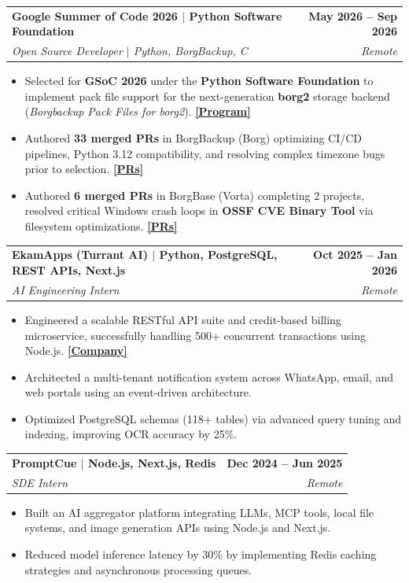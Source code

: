 \documentclass[letterpaper,11pt]{article}
\makeatletter
\newcommand{\resumeItem}[1]{
  \item\small{
    {#1 \vspace{-2pt}}
  }
}
\newcommand{\resumeSubheading}[4]{
  \vspace{-2pt}\item
    \begin{tabular*}{1.0\textwidth}[t]{l@{\extracolsep{\fill}}r}
      \textbf{#1} & \textbf{\small #2} \\
      \textit{\small#3} & \textit{\small #4} \\
    \end{tabular*}\vspace{-7pt}
}
\newcommand{\resumeItemListStart}{\begin{itemize}[itemsep=-2pt]}
\newcommand{\resumeItemListEnd}{\end{itemize}\vspace{-5pt}}
\makeatother
\begin{document}
    \resumeSubheading
      {\textbf{Google Summer of Code 2026} $|$ \textmd{Python Software Foundation}}{May 2026 -- Sep 2026}
      {Open Source Developer $|$ Python, BorgBackup, C}{Remote}
      \resumeItemListStart
        \resumeItem{Selected for \textbf{GSoC 2026} under the \textbf{Python Software Foundation} to implement pack file support for the next-generation \textbf{borg2} storage backend (\textit{Borgbackup Pack Files for borg2}). \hspace*{\fill} \href{https://summerofcode.withgoogle.com/programs/2026/organizations/python-software-foundation}{\textbf{[Program]}}}
        \resumeItem{Authored \textbf{33 merged PRs} in BorgBackup (Borg) optimizing CI/CD pipelines, Python 3.12 compatibility, and resolving complex timezone bugs prior to selection. \hspace*{\fill} \href{https://github.com/borgbackup/borg/pulls?q=is\%3Amerged+is\%3Apr+author\%3Amr-raj12}{\textbf{[PRs]}}}
        \resumeItem{Authored \textbf{6 merged PRs} in BorgBase (Vorta) completing 2 projects, resolved critical Windows crash loops in \textbf{OSSF CVE Binary Tool} via filesystem optimizations. \hspace*{\fill} \href{https://github.com/borgbase/vorta/pulls?q=is\%3Amerged+is\%3Apr+author\%3Amr-raj12}{\textbf{[PRs]}}}
      \resumeItemListEnd

    \resumeSubheading
      {\textbf{EkamApps (Turrant AI)} $|$ \textmd{Python, PostgreSQL, REST APIs, Next.js}}{Oct 2025 -- Jan 2026}
      {AI Engineering Intern}{Remote}
      \resumeItemListStart
        \resumeItem{Engineered a scalable RESTful API suite and credit-based billing microservice, successfully handling 500+ concurrent transactions using Node.js. \hspace*{\fill} \href{https://turrant.ai/}{\textbf{[Company]}}}
        \resumeItem{Architected a multi-tenant notification system across WhatsApp, email, and web portals using an event-driven architecture.}
        \resumeItem{Optimized PostgreSQL schemas (118+ tables) via advanced query tuning and indexing, improving OCR accuracy by 25\%.}
      \resumeItemListEnd

    \resumeSubheading
      {\textbf{PromptCue} $|$ \textmd{Node.js, Next.js, Redis}}{Dec 2024 -- Jun 2025}
      {SDE Intern}{Remote}
      \resumeItemListStart
        \resumeItem{Built an AI aggregator platform integrating LLMs, MCP tools, local file systems, and image generation APIs using Node.js and Next.js.}
        \resumeItem{Reduced model inference latency by 30\% by implementing Redis caching strategies and asynchronous processing queues.}
      \resumeItemListEnd
\end{document}
